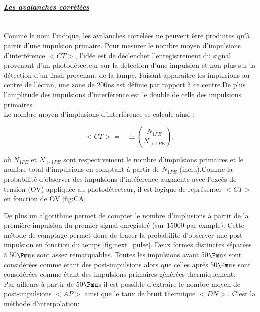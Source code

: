 \documentclass[a4paper, 11pt]{report}%
\begin{document}
  \newpage
  
\paragraph{\textit{\underline{Les avalanches corr\'el\'ees}}}
  \leavevmode
  \\
  
  Comme le nom l'indique, les avalanches corr\'el\'ees ne peuvent \^etre produites qu'\`a partir d'une impulsion primaire. 
  Pour mesurer le nombre moyen d'impulsions d'interf\'erence $<CT>$, l'id\'ee est de d\'eclencher l'enregistrement du signal provenant d'un 
  photod\'etecteur sur la d\'etection d'une impulsion et non plus sur la d\'etection d'un flash provenant de la lampe. Faisant appara\^itre 
  les impulsions au centre de l'\'ecran, une zone de 200ns est d\'efinie par rapport \`a ce centre.De plus l'amplitude des impulsions 
  d'interf\'erence est le double de celle des impulsions primaires.\\
  Le nombre moyen d'implusions d'interf\'erence se calcule ainsi :
  
  \begin{equation}
    <CT> = -\ln(\frac{N_{1PE}}{N_{>1PE}}),
  \end{equation}
  
  o\`u $N_{1PE}$ et $N_{>1PE}$ sont respectivement le nombre d'impulsions primaires et le nombre total d'impulsions en comptant \`a 
  partir de $N_{1PE}$ (inclu).Comme la probabilit\'e d'observer des impulsions d'int\'eference augmente avec l'exc\`es de tension (OV) 
  appliqu\'ee au photod\'etecteur, il est logique de repr\'esenter $<CT>$ en fonction de OV \ref{fig:CA}.
  
  De plus un algotithme permet de compter le nombre d'implusions \`a partir de la premi\`ere impulsion du premier signal enregistr\'e
  (sur 15000 par exmple). Cette m\'etode de comptage permet donc de tracer la probabilit\'e d'observer une post-impulsion en fonction
  du temps \ref{fig:next_pulse}. Deux formes distinctes s\'epar\'ees \`a 50$\Pmu$s sont assez remarquables. Toutes les  impulsions avant 
  50$\Pmu$s sont consid\'er\'ees comme \'etant des post-impulsions alors que celles apr\`es 
  50$\Pmu$s sont consid\'er\'ees comme \'etant des impulsions primaires g\'en\'er\'ees thermiquement.\\
  Par ailleurs \`a partir de 50$\Pmu$s il est possible d'extraire le nombre moyen de post-impulsions $<AP>$ ainsi que le taux de bruit 
  thermique $<DN>$. C'est la m\'ethode d'interpolation:
  
\end{document}
